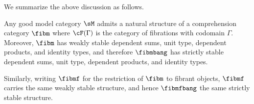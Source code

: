 \documentclass{amsart}
\let\sec\S
\let\S\cS
\begin{document}
We summarize the above discussion as follows.

\begin{thm}\label{thm:gmc-tt}
  Any good model category $\sM$ admits a natural structure of a comprehension category $\fibm$ where $\cF(\Gamma)$ is the category of fibrations with codomain $\Gamma$.
  Moreover, $\fibm$ has weakly stable dependent sums, unit type, dependent products, and identity types, and therefore $\fibmbang$ has strictly stable dependent sums, unit type, dependent products, and identity types.

  Similarly, writing $\fibmf$ for the restriction of $\fibm$ to fibrant objects, $\fibmf$ carries the same weakly stable structure, and hence $\fibmfbang$ the same strictly stable structure.
\end{thm}




\end{document}
